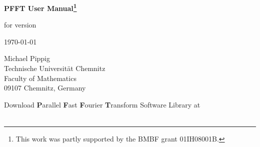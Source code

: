 \documentclass[a4paper,11pt,final,openright,headsepline]{scrreprt}
\numberwithin{figure}{chapter}
\numberwithin{table}{chapter}
\numberwithin{equation}{chapter}
\begin{document}
  \setcounter{equation}{0}
  \begin{titlepage}
    \begin{center}
      \vspace*{3cm}
      {\Huge {\textbf{\textsf{PFFT User Manual\footnote{This work was partly supported by the BMBF grant 01IH08001B.}\\}}}}

      \vspace*{0.5cm}
      for version \pfftversion

      \vspace*{1cm}
      \today
      
      \vspace*{3cm}
        Michael Pippig\\
        Technische Universit\"at Chemnitz\\
        Faculty of Mathematics\\
        09107 Chemnitz, Germany

    \vspace*{3cm}
      Download \textbf{\Large P}arallel \textbf{\Large F}ast \textbf{\Large F}ourier \textbf{\Large T}ransform Software Library at \\
      {\large \websoft}\\
    \end{center}
  \end{titlepage}

  \tableofcontents
 



  
  
\end{document}
